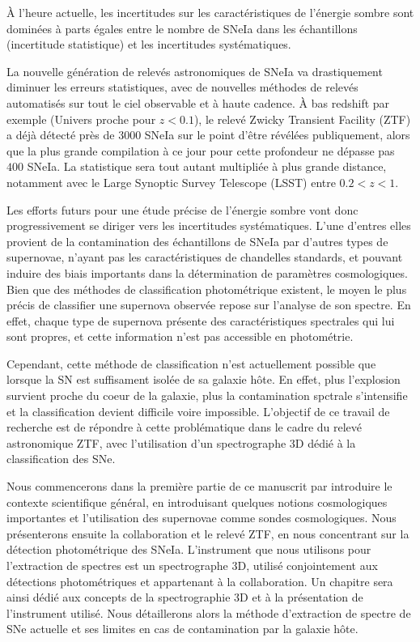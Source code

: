 \documentclass[../main/main.tex]{subfiles}
\begin{document}
À l'heure actuelle, les incertitudes sur les caractéristiques de
l'énergie sombre sont dominées à parts égales entre le nombre de SNeIa dans les
échantillons (incertitude statistique) et les incertitudes
systématiques.

La nouvelle génération de relevés astronomiques de SNeIa va
drastiquement diminuer les erreurs statistiques, avec de nouvelles
méthodes de relevés automatisés sur tout le ciel observable et à haute
cadence. À bas redshift par exemple (Univers proche pour $z<0.1$), le relevé Zwicky
Transient Facility (ZTF) a déjà détecté près de $3000$ SNeIa sur le point
d'être révélées publiquement, alors
que la plus grande compilation à ce jour pour cette profondeur ne
dépasse pas $400$ SNeIa.
La statistique sera tout autant multipliée à plus grande distance,
notamment avec le Large Synoptic Survey Telescope (LSST) entre
$0.2<z<1$.

Les efforts futurs pour une étude précise de l'énergie sombre vont donc progressivement
se diriger vers les incertitudes systématiques. L'une d'entres elles
provient de la contamination des échantillons de SNeIa par d'autres
types de supernovae, n'ayant pas les caractéristiques de chandelles
standards, et pouvant induire des biais importants dans la détermination
de paramètres cosmologiques. Bien que des méthodes de classification photométrique
existent, le moyen le plus précis de classifier une supernova
observée repose sur l'analyse de son spectre. En effet, chaque type de
supernova présente des caractéristiques spectrales qui lui sont propres,
et cette information n'est pas accessible en photométrie.

Cependant, cette méthode de classification n'est actuellement possible que
lorsque la SN est suffisament isolée de sa galaxie hôte. En effet, plus
l'explosion survient proche du coeur de la galaxie, plus la
contamination spctrale s'intensifie et la classification devient
difficile voire impossible. L'objectif de ce travail de recherche est de
répondre à cette problématique dans le cadre du relevé astronomique ZTF,
avec l'utilisation d'un spectrographe 3D dédié à la classification des
SNe.

Nous commencerons dans la première partie de ce manuscrit par introduire
le contexte scientifique général, en introduisant quelques notions
cosmologiques importantes et l'utilisation des supernovae comme sondes
cosmologiques. Nous présenterons ensuite la collaboration et le relevé
ZTF, en nous concentrant sur la détection photométrique des
SNeIa. L'instrument que nous utilisons pour l'extraction de spectres est un spectrographe 3D, utilisé
conjointement aux détections photométriques et appartenant à la
collaboration. Un chapitre sera ainsi dédié aux
concepts de la spectrographie 3D et à la présentation de l'instrument
utilisé. Nous détaillerons alors la méthode d'extraction de spectre de SNe
actuelle et ses limites en cas de contamination par la galaxie hôte.
\end{document}
